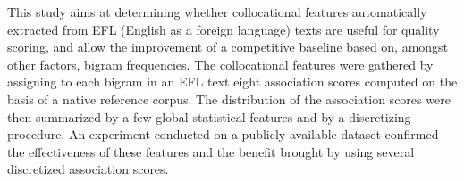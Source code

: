 This study aims at determining whether collocational features automatically extracted from EFL (English as a foreign language) texts are useful for quality scoring, and allow the improvement of a competitive baseline based on, amongst other factors, bigram frequencies. The collocational features were gathered by assigning to each bigram in an EFL text eight association scores computed on the basis of a native reference corpus. The distribution of the association scores were then summarized by a few global statistical features and by a discretizing procedure. An experiment conducted on a publicly available dataset confirmed the effectiveness of these features and the benefit brought by using several discretized association scores.
